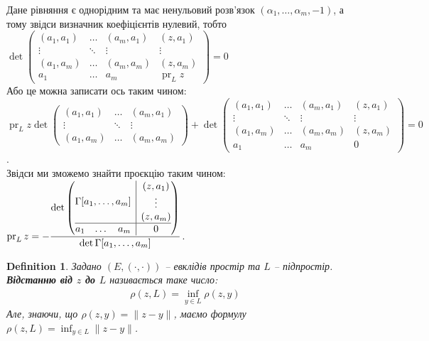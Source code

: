\documentclass[a4paper, 10pt]{article}
\theoremstyle{theoremdd}
\newtheorem{definition}[theorem]{Definition}
\DeclareMathOperator{\pr}{pr}
\begin{document}
Дане рівняння є однорідним та має ненульовий розв'язок $(\alpha_1,\dots,\alpha_m,-1)$, а тому звідси визначник коефіцієнтів нулевий, тобто\\
$\det \begin{pmatrix}
(a_1,a_1) & \dots & (a_m,a_1) & (z,a_1) \\
\vdots & \ddots & \vdots & \vdots \\
(a_1,a_m) & \dots & (a_m,a_m) & (z,a_m) \\
a_1 & \dots & a_m & \pr_L z
\end{pmatrix} = 0$\\
Або це можна записати ось таким чином:\\
$\pr_L z \det \begin{pmatrix}
(a_1,a_1) & \dots & (a_m,a_1) \\
\vdots & \ddots & \vdots \\
(a_1,a_m) & \dots & (a_m,a_m)
\end{pmatrix} + \det \begin{pmatrix}
(a_1,a_1) & \dots & (a_m,a_1) & (z,a_1) \\
\vdots & \ddots & \vdots & \vdots \\
(a_1,a_m) & \dots & (a_m,a_m) & (z,a_m) \\
a_1 & \dots & a_m & 0
\end{pmatrix} = 0$.\\
Звідси ми зможемо знайти проєкцію таким чином:\\
$\pr_L z = -\dfrac{\det \left(\begin{array}{@{}c|c@{}}
\Gamma[a_1,\dots,a_m] & \begin{matrix} (z,a_1) \\ \vdots \\ (z,a_m) \end{matrix} \\
\hline
\begin{matrix} a_1 & \dots & a_m \end{matrix} & 0
\end{array}\right)}{\det\Gamma[a_1,\dots,a_m]}$.

\begin{definition}
Задано $(E,(\cdot,\cdot))$ -- евклідів простір та $L$ -- підпростір.\\
\textbf{Відстанню від $z$ до $L$} називається таке число:
\begin{align*}
\rho (z,L) = \inf_{y \in L} \rho(z,y)
\end{align*}
Але, знаючи, що $\rho(z,y) = \| z-y \|$, маємо формулу $\rho(z,L) =\displaystyle \inf_{y \in L} \| z-y\|$.
\end{definition}
\end{document}
